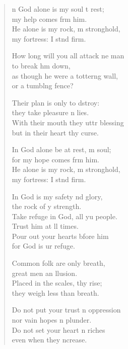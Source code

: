 \begin{verse}
  \begin{patverse}
n God alone is my soul t rest;\Med\\
my help comes frm him.\\
He alone is my rock, m stronghold,\Med\\
my fortress: I stnd firm.

How long will you all attack ne man\Med\\
to break h\pointup{\i}m down,\\
as though he were a totter\pointup{\i}ng wall,\Med\\
or a tumbl\pointup{\i}ng fence?

Their plan is only to dstroy:\Med\\
they take pleasure \pointup{\i}n lies.\\
With their mouth they uttr blessing\Med\\
but in their heart thy curse.

In God alone be at rest, m soul;\Med\\
for my hope comes frm him.\\
He alone is my rock, m stronghold,\Med\\
my fortress: I stnd firm.

In God is my safety nd glory,\Med\\
the rock of y strength.\\
Take refuge in God, all yu people.\Med\\
Trust him at ll times.\\
Pour out your hearts bfore him\Med\\
for God is ur refuge.

Common folk are only  breath,\Med\\
great men an \pointup{\i}llusion.\\
Placed in the scales, thy rise;\Med\\
they weigh less than  breath.

Do not put your trust \pointup{\i}n oppression\Med\\
nor vain hopes n plunder.\\
Do not set your heart n riches\Med\\
even when they \pointup{\i}ncrease.


\end{patverse}
\end{verse}
